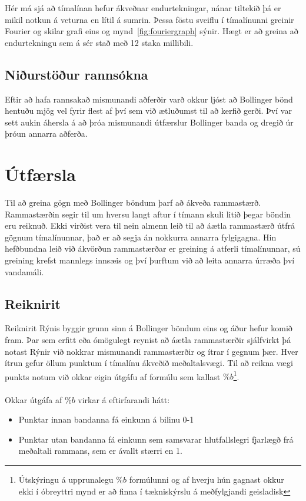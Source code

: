 \documentclass{article}
\begin{document}
Hér má sjá að tímalínan hefur ákveðnar endurtekningar, nánar tiltekið þá er mikil notkun á veturna en lítil á sumrin.
Þessa föstu sveiflu í tímalínunni greinir Fourier og skilar grafi eins og mynd~\ref{fig:fouriergraph} sýnir. 
Hægt er að greina að endurtekningu sem á sér stað með 12 staka millibili.

\subsection{Niðurstöður rannsókna}
Eftir að hafa rannsakað mismunandi aðferðir varð okkur ljóst að Bollinger bönd hentuðu
mjög vel fyrir flest af því sem við ætluðumst til að kerfið gerði.
Því var sett aukin áhersla á að þróa mismunandi útfærslur Bollinger banda og
dregið úr þróun annarra aðferða. 

\section{Útfærsla}
\label{sec:imp_our}
Til að greina gögn með Bollinger böndum þarf að ákveða rammastærð.
Rammastærðin segir til um hversu langt aftur í tímann skuli litið þegar böndin eru reiknuð.
Ekki virðist vera til nein almenn leið til að áætla rammastærð útfrá gögnum tímalínunnar, það er að segja án 
nokkurra annarra fylgigagna.
Hin hefðbundna leið við ákvörðun rammastærðar er greining á atferli tímalínunnar, sú greining krefst mannlegs innsæis og því 
þurftum við að leita annarra úrræða því vandamáli.

\subsection{Reiknirit}
\label{sec:imp_algorithm}
Reiknirit Rýnis byggir grunn sinn á Bollinger böndum eins og áður hefur komið fram.
Þar sem erfitt eða ómögulegt reynist að áætla rammastærðir sjálfvirkt þá notast Rýnir við nokkrar mismunandi
rammastærðir og ítrar í gegnum þær. Hver ítrun gefur öllum punktum í tímalínu ákveðið meðaltalsvægi. Til að reikna
vægi punkts notum við okkar eigin útgáfu af formúlu sem kallast 
$\%b$\footnote[1]{Útskýringu á upprunalegu $\%b$ formúlunni og af hverju hún gagnast okkur ekki í óbreyttri mynd er að finna í tækniskýrslu á meðfylgjandi geisladisk}. 
\\ \hfil
\\ \hfil
Okkar útgáfa af $\%b$ virkar á eftirfarandi hátt:
\begin{itemize}
  \item Punktar innan bandanna fá einkunn á bilinu 0-1
  \item Punktar utan bandanna fá einkunn sem samsvarar hlutfallslegri fjarlægð frá meðaltali rammans, sem er ávallt stærri en 1.
\end{itemize}
\end{document}
